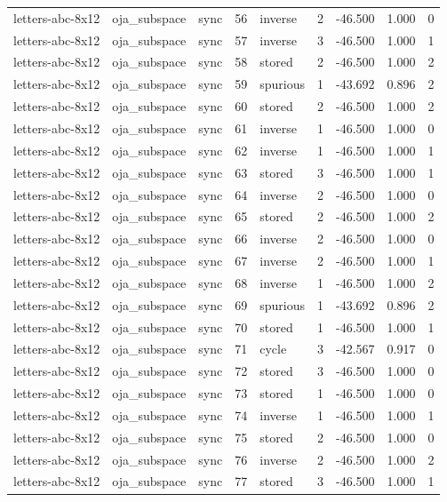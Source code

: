 \begin{tabular}{lllrlrrrr}
letters-abc-8x12 & oja\_subspace & sync & 56 & inverse & 2 & -46.500 & 1.000 & 0 \\
letters-abc-8x12 & oja\_subspace & sync & 57 & inverse & 3 & -46.500 & 1.000 & 1 \\
letters-abc-8x12 & oja\_subspace & sync & 58 & stored & 2 & -46.500 & 1.000 & 2 \\
letters-abc-8x12 & oja\_subspace & sync & 59 & spurious & 1 & -43.692 & 0.896 & 2 \\
letters-abc-8x12 & oja\_subspace & sync & 60 & stored & 2 & -46.500 & 1.000 & 2 \\
letters-abc-8x12 & oja\_subspace & sync & 61 & inverse & 1 & -46.500 & 1.000 & 0 \\
letters-abc-8x12 & oja\_subspace & sync & 62 & inverse & 1 & -46.500 & 1.000 & 1 \\
letters-abc-8x12 & oja\_subspace & sync & 63 & stored & 3 & -46.500 & 1.000 & 1 \\
letters-abc-8x12 & oja\_subspace & sync & 64 & inverse & 2 & -46.500 & 1.000 & 0 \\
letters-abc-8x12 & oja\_subspace & sync & 65 & stored & 2 & -46.500 & 1.000 & 2 \\
letters-abc-8x12 & oja\_subspace & sync & 66 & inverse & 2 & -46.500 & 1.000 & 0 \\
letters-abc-8x12 & oja\_subspace & sync & 67 & inverse & 2 & -46.500 & 1.000 & 1 \\
letters-abc-8x12 & oja\_subspace & sync & 68 & inverse & 1 & -46.500 & 1.000 & 2 \\
letters-abc-8x12 & oja\_subspace & sync & 69 & spurious & 1 & -43.692 & 0.896 & 2 \\
letters-abc-8x12 & oja\_subspace & sync & 70 & stored & 1 & -46.500 & 1.000 & 1 \\
letters-abc-8x12 & oja\_subspace & sync & 71 & cycle & 3 & -42.567 & 0.917 & 0 \\
letters-abc-8x12 & oja\_subspace & sync & 72 & stored & 3 & -46.500 & 1.000 & 0 \\
letters-abc-8x12 & oja\_subspace & sync & 73 & stored & 1 & -46.500 & 1.000 & 0 \\
letters-abc-8x12 & oja\_subspace & sync & 74 & inverse & 1 & -46.500 & 1.000 & 1 \\
letters-abc-8x12 & oja\_subspace & sync & 75 & stored & 2 & -46.500 & 1.000 & 0 \\
letters-abc-8x12 & oja\_subspace & sync & 76 & inverse & 2 & -46.500 & 1.000 & 2 \\
letters-abc-8x12 & oja\_subspace & sync & 77 & stored & 3 & -46.500 & 1.000 & 1 \\

\end{tabular}
